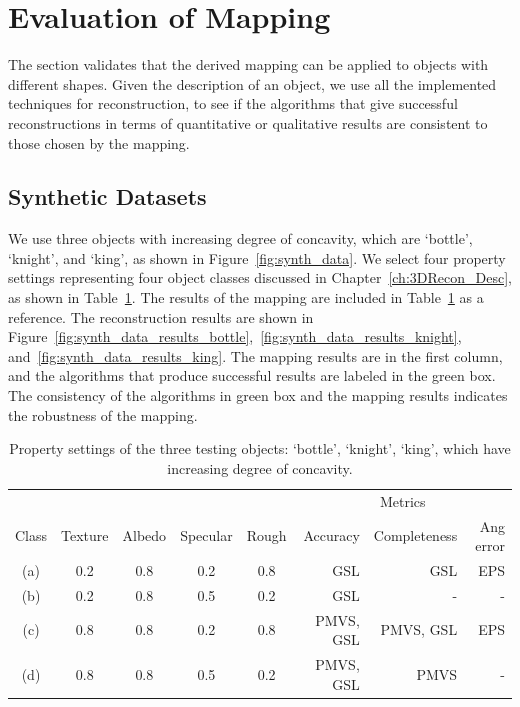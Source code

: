 \section{Evaluation of Mapping}
\label{sec:eval_mapping}
The section validates that the derived mapping can be applied to objects with different shapes. Given the description of an object, we use all the implemented techniques for reconstruction, to see if the algorithms that give successful reconstructions in terms of quantitative or qualitative results are consistent to those chosen by the mapping.

\subsection{Synthetic Datasets}
We use three objects with increasing degree of concavity, which are `bottle', `knight', and `king', as shown in Figure~\ref{fig:synth_data}. We select four property settings representing four object classes discussed in Chapter~\ref{ch:3DRecon_Desc}, as shown in Table~\ref{tab:prop_list_synth_data}. The results of the mapping are included in Table~\ref{tab:prop_list_synth_data} as a reference. The reconstruction results are shown in Figure~\ref{fig:synth_data_results_bottle},~\ref{fig:synth_data_results_knight}, and~\ref{fig:synth_data_results_king}. The mapping results are in the first column, and the algorithms that produce successful results are labeled in the green box. The consistency of the algorithms in green box and the mapping results indicates the robustness of the mapping.
\begin{table}[!htbp]
  \centering
  \begin{tabular}{*{5}{c}|*{3}{r}}
  \hline
  & & & & & \multicolumn{3}{c}{Metrics}\\
  Class & Texture & Albedo & Specular & Rough & Accuracy & Completeness & Ang error\\
  \hline
  (a) & 0.2 & 0.8 & 0.2 & 0.8 & GSL & GSL & EPS\\
  (b) & 0.2 & 0.8 & 0.5 & 0.2 & GSL & - & - \\
  (c) & 0.8 & 0.8 & 0.2 & 0.8 & PMVS, GSL & PMVS, GSL & EPS \\
  (d) & 0.8 & 0.8 & 0.5 & 0.2 & PMVS, GSL & PMVS & -\\
  \hline
  \end{tabular}
  \caption{Property settings of the three testing objects: `bottle', `knight', `king', which have increasing degree of concavity.}
  \label{tab:prop_list_synth_data}
\end{table}

